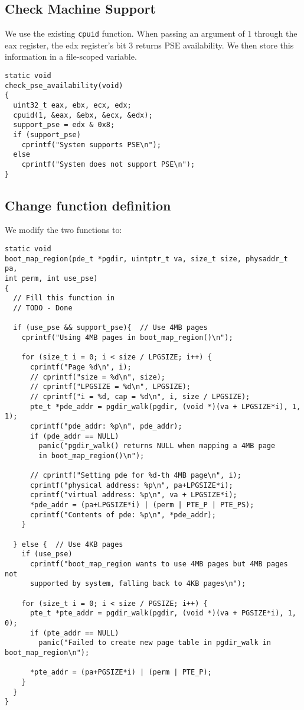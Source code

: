 \documentclass[]{article}
\begin{document}
\subsection*{Check Machine Support}
We use the existing \verb|cpuid| function. When passing an argument of 1 through the eax register, the edx register's bit 3 returns PSE availability. We then store this information in a file-scoped variable.

\begin{verbatim}
static void
check_pse_availability(void)
{
  uint32_t eax, ebx, ecx, edx;
  cpuid(1, &eax, &ebx, &ecx, &edx);
  support_pse = edx & 0x8;
  if (support_pse)
    cprintf("System supports PSE\n");
  else
    cprintf("System does not support PSE\n");
}
\end{verbatim}

\subsection*{Change function definition}

We modify the two functions to:

\begin{verbatim}
static void
boot_map_region(pde_t *pgdir, uintptr_t va, size_t size, physaddr_t pa,
int perm, int use_pse)
{
  // Fill this function in
  // TODO - Done

  if (use_pse && support_pse){	// Use 4MB pages
    cprintf("Using 4MB pages in boot_map_region()\n");

    for (size_t i = 0; i < size / LPGSIZE; i++) {
      cprintf("Page %d\n", i);
      // cprintf("size = %d\n", size);
      // cprintf("LPGSIZE = %d\n", LPGSIZE);
      // cprintf("i = %d, cap = %d\n", i, size / LPGSIZE);
      pte_t *pde_addr = pgdir_walk(pgdir, (void *)(va + LPGSIZE*i), 1, 1);
      cprintf("pde_addr: %p\n", pde_addr);
      if (pde_addr == NULL)
        panic("pgdir_walk() returns NULL when mapping a 4MB page 
        in boot_map_region()\n");

      // cprintf("Setting pde for %d-th 4MB page\n", i);
      cprintf("physical address: %p\n", pa+LPGSIZE*i);
      cprintf("virtual address: %p\n", va + LPGSIZE*i);
      *pde_addr = (pa+LPGSIZE*i) | (perm | PTE_P | PTE_PS);
      cprintf("Contents of pde: %p\n", *pde_addr);
    }

  } else {	// Use 4KB pages
    if (use_pse)
      cprintf("boot_map_region wants to use 4MB pages but 4MB pages not 
      supported by system, falling back to 4KB pages\n");

    for (size_t i = 0; i < size / PGSIZE; i++) {
      pte_t *pte_addr = pgdir_walk(pgdir, (void *)(va + PGSIZE*i), 1, 0);
      if (pte_addr == NULL)
        panic("Failed to create new page table in pgdir_walk in boot_map_region\n");

      *pte_addr = (pa+PGSIZE*i) | (perm | PTE_P);
    }
  }
}
\end{verbatim}
\end{document}
